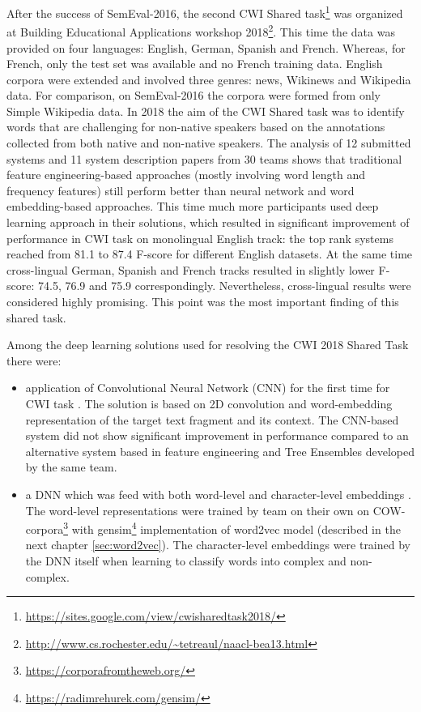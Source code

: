 After the success of SemEval-2016, the second CWI Shared task\footnote{\url{https://sites.google.com/view/cwisharedtask2018/}} was organized at Building Educational Applications workshop 2018\footnote{\url{http://www.cs.rochester.edu/~tetreaul/naacl-bea13.html}}. This time the data was provided on four languages: English, German, Spanish and French. Whereas, for French, only the test set was available and no French training data. English corpora were extended and involved three genres: news, Wikinews and Wikipedia data. For comparison, on SemEval-2016 the corpora were formed from only Simple Wikipedia data. In 2018 the aim of the CWI Shared
task was to identify words that are challenging for non-native speakers based on the annotations collected from both native and non-native speakers. 
The analysis \citep{Yimam-BEA2018} of 12 submitted systems and 11 system description papers from 30 teams shows that traditional feature engineering-based approaches (mostly involving word length and frequency features) still perform better than neural network and word embedding-based approaches. This time much more participants used deep learning approach in their solutions, which resulted in significant improvement of performance in CWI task on monolingual English track: the top rank systems reached from 81.1 to 87.4 F-score for different English datasets. At the same time cross-lingual German, Spanish and French tracks resulted in slightly lower F-score: 74.5, 76.9 and 75.9 correspondingly. Nevertheless, cross-lingual results were considered highly promising. This point was the most important finding of this shared task. 

Among the deep learning solutions used for resolving the CWI 2018 Shared Task  there were:
\begin{itemize}
    \item application of Convolutional Neural Network (CNN) for the first time for CWI task \citep{Aroyehun-BEA2018}. The solution is based on 2D convolution and word-embedding representation of the target text fragment and its context. The CNN-based system did not show significant improvement in performance compared to an alternative system based in feature engineering and Tree Ensembles developed by the same team. 
    
    \item a DNN which was feed with both word-level and character-level embeddings \citep{DeHertog-ACL2018}. The word-level representations were trained by team on their own on COW-corpora\footnote{\url{https://corporafromtheweb.org/}} with gensim\footnote{\url{https://radimrehurek.com/gensim/}} implementation of word2vec model (described in the next chapter \ref{sec:word2vec}). The character-level embeddings were trained by the DNN itself when learning to classify words into complex and non-complex.
\end{itemize}

